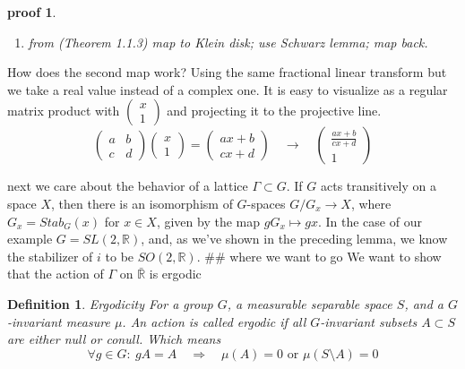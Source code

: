 \documentclass[
  12pt
]{article}
\providecommand{\tightlist}{%
  \setlength{\itemsep}{0pt}\setlength{\parskip}{0pt}}
\theoremstyle{break}
\newtheorem{defn}{Definition}[thm]
\theoremstyle{plain}
\newtheorem*{pf}{proof}
\begin{document}
  \begin{pf}\label{pf:miyake}
  \begin{enumerate}
  \def\labelenumi{\arabic{enumi}.}
  \tightlist
  \item
    from \cite{Miyake89}(Theorem 1.1.3) map to Klein disk; use Schwarz
    lemma; map back.
  \end{enumerate}
  \end{pf}

  How does the second map work? Using the same fractional linear transform
  but we take a real value instead of a complex one. It is easy to
  visualize as a regular matrix product with
  $\begin{pmatrix}x \\ 1\end{pmatrix}$ and projecting it to the
  projective line. \[
  \begin{pmatrix}a & b \\ c & d\end{pmatrix}\begin{pmatrix}x \\ 1\end{pmatrix} =
  \begin{pmatrix}ax + b \\ cx + d\end{pmatrix} \quad \rightarrow \quad
  \begin{pmatrix}\frac{ax + b}{cx + d} \\ 1\end{pmatrix}
  \] 

  next we care about the behavior of a lattice $\Gamma \subset G$. If
  $G$ acts transitively on a space $X$, then there is an isomorphism
  of $G$-spaces $G/G_x \rightarrow X$, where $G_x = Stab_G (x)$ for
  $x \in X$, given by the map $gG_x \mapsto gx$. In the case of our
  example $G = SL(2, \mathbb{R})$, and, as we've shown in the preceding
  lemma, we know the stabilizer of $i$ to be $SO(2,\mathbb{R})$. \#\#
  where we want to go We want to show that the action of $\Gamma$ on
  $\bar{\mathbb{R}}$ is ergodic

  \begin{defn}{Ergodicity}
  For a group $G$, a measurable separable space $S$, and a $G$-invariant measure $\mu$. An action is called ergodic if all $G$-invariant subsets $A\subset S$ are either null or conull. Which means 
  $$
  \forall g\in G:\ gA = A \quad \Rightarrow \quad \mu(A)=0 \text{ or } \mu(S\setminus A)=0
  $$
  \end{defn}
\end{document}
